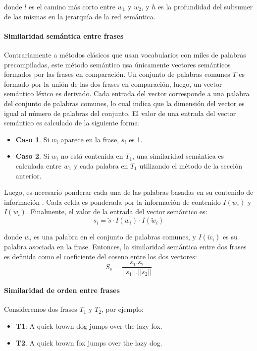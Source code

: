 donde \(l\) es el camino más corto entre \(w_1\) y \(w_2\), y \(h\) es la profundidad del subsumer de las mismas en la jerarquía de la red semántica.

\paragraph{Similaridad semántica entre frases}
Contrariamente a métodos clásicos que usan vocabularios con miles de palabras precompiladas, este método semántico usa únicamente vectores semánticos formados por las frases en comparación. Un conjunto de palabras comunes \(T\) es formado por la unión de las dos frases en comparación, luego, un vector semántico léxico es derivado. Cada entrada del vector corresponde a una palabra del conjunto de palabras comunes, lo cual indica que la dimensión del vector es igual al número de palabras del conjunto. El valor de una entrada del vector semántico es calculado de la siguiente forma:
\begin{itemize}
	\item \textbf{Caso 1}. Si \(w_i\) aparece en la frase, \(s_i\) es 1.
	\item \textbf{Caso 2}. Si \(w_i\) no está contenida en \(T_1\), una similaridad semántica es calculada entre \(w_1\) y cada palabra en \(T_1\) utilizando el método de la sección anterior.
\end{itemize}

Luego, es necesario ponderar cada una de las palabras basadas en su contenido de información \citep{ribadas2005semantic}. Cada celda es ponderada por la información de contenido \(I(w_i)\) y \(I(\widetilde{w}_i)\). Finalmente, el valor de la entrada del vector semántico es:
\[s_i = \check{s} \cdot I(w_i) \cdot I(\widetilde{w}_i)\]

donde \(w_i\) es una palabra en el conjunto de palabras comunes, y \(I(\widetilde{w}_i)\) es su palabra asociada en la frase. Entonces, la similaridad semántica entre dos frases es definida como el coeficiente del coseno entre los dos vectores:
\[S_s = \frac{s_1. s_2}{||s_1||.||s_2||}\]

\paragraph{Similaridad de orden entre frases}
Consideremos dos frases \(T_1\) y \(T_2\), por ejemplo:
\begin{itemize}
	\item \textbf{T1}: A quick brown dog jumps over the lazy fox.
	\item \textbf{T2}. A quick brown fox jumps over the lazy dog.
\end{itemize}

